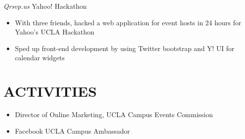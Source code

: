 \documentclass{res}
\begin{document}
\begin{resume}
 {\sl Qrsvp.us} \hfill Yahoo! Hackathon

  \begin{itemize} \itemsep -2pt
  \item  With three friends, hacked a web application for event hosts in 24 hours for Yahoo’s UCLA Hackathon
  \item Sped up front-end development by using Twitter bootstrap and Y! UI for calendar widgets
  \end{itemize} \vspace{-6pt}

\section{ACTIVITIES}
\vspace{0.25in}
  \begin{itemize} \itemsep -2pt
  \item Director of Online Marketing, UCLA Campus Events Commission
  \item Facebook UCLA Campus Ambassador
  \end{itemize}

\end{resume}
\end{document}
